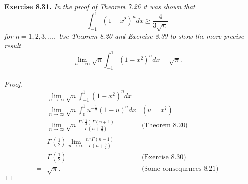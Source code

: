 \documentclass{article}
\begin{document}
\textbf{Exercise 8.31.}
\emph{In the proof of Theorem 7.26 it was shown that
\[
  \int_{-1}^{1} (1-x^2)^n dx \geq \frac{4}{3\sqrt{n}}
\]
for $n=1,2,3,\ldots$.
Use Theorem 8.20 and Exercise 8.30 to show the more precise result
\[
\lim_{n \to \infty} \sqrt{n} \int_{-1}^{1} (1-x^2)^n dx = \sqrt{\pi}.
\]} \\

\emph{Proof.}
\begin{align*}
  &\lim_{n \to \infty} \sqrt{n} \int_{-1}^{1} (1-x^2)^n dx \\
  =& \lim_{n \to \infty} \sqrt{n} \int_{0}^{1} u^{-\frac{1}{2}} (1-u)^n dx
    &(u = x^2) \\
  =& \lim_{n \to \infty} \sqrt{n}
    \frac{\Gamma\left( \frac{1}{2} \right) \Gamma(n+1)}{\Gamma\left( n+\frac{3}{2} \right)}
    &\text{(Theorem 8.20)} \\
  =& \Gamma\left( \frac{1}{2} \right) \lim_{n \to \infty}
    \frac{n^{\frac{1}{2}} \Gamma(n+1)}{\Gamma\left( n+\frac{3}{2} \right)} \\
  =& \Gamma\left( \frac{1}{2} \right)
    &\text{(Exercise 8.30)} \\
  =& \sqrt{\pi}.
    &\text{(Some consequences 8.21)}
\end{align*}
$\Box$ \\\\



\end{document}
